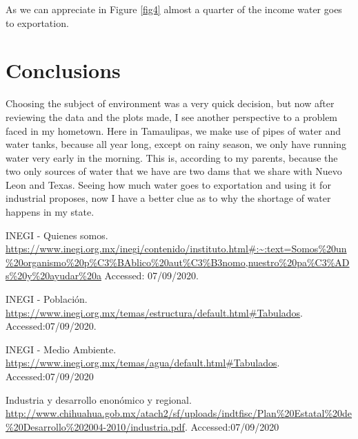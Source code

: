 \documentclass{article}
\begin{document}
As we can appreciate in Figure \ref{fig4} almost a quarter of the income water goes to exportation.\\

\section{Conclusions}

Choosing the subject of environment was a very quick decision, but now after reviewing the data and the plots made, I see another perspective to a problem faced in my hometown. Here in Tamaulipas, we make use of pipes of water and water tanks, because all year long, except on rainy season, we only have running water very early in the morning. This is, according to my parents, because the two only sources of water that we have are two dams that we share with Nuevo Leon and Texas. Seeing how much water goes to exportation and using it for industrial proposes, now I have a better clue as to why the shortage of water happens in my state.\\

\begin{thebibliography}{4}

 INEGI - Quienes somos. \url{https://www.inegi.org.mx/inegi/contenido/instituto.html#:~:text=Somos\%20un\%20organismo\%20p\%C3\%BAblico\%20aut\%C3\%B3nomo,nuestro\%20pa\%C3\%ADs\%20y\%20ayudar\%20a} Accessed: 07/09/2020.

 INEGI - Poblaci\'on. \url{https://www.inegi.org.mx/temas/estructura/default.html\#Tabulados}. Accessed:07/09/2020.

 INEGI - Medio Ambiente. \url{https://www.inegi.org.mx/temas/agua/default.html#Tabulados}. Accessed:07/09/2020

 Industria y desarrollo enon\'omico y regional. \url{http://www.chihuahua.gob.mx/atach2/sf/uploads/indtfisc/Plan\%20Estatal\%20de\%20Desarrollo\%202004-2010/industria.pdf}. Accessed:07/09/2020

\end{thebibliography}
 
\end{document}
